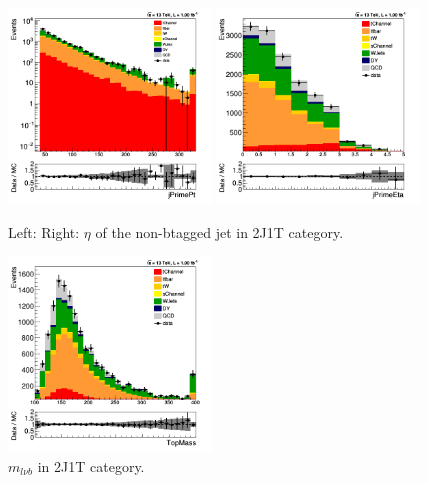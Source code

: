 \begin{figure}[!Hhtb]
  \begin{center}
    \includegraphics[width=0.48\textwidth]{figures/2J1T/jprime_pt.png}
    \includegraphics[width=0.48\textwidth]{figures/2J1T/jprime_eta.png}
    \caption{\label{fig:2J1TMETMT}{Left: \PT  Right: $\eta$ of the non-btagged jet in 2J1T category.}}
  \end{center}
\end{figure}




\begin{figure}[!Hhtb]
  \begin{center}
    \includegraphics[width=0.48\textwidth]{figures/2J1T/TopMass.png}
    \caption{\label{fig:2J1TMETMT}{$m_{l\nu b}$ in 2J1T category.}}
  \end{center}
\end{figure}



